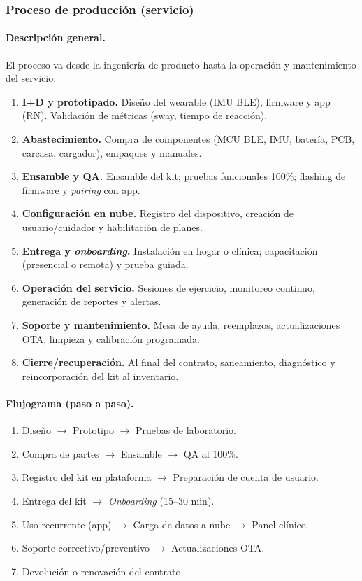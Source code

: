 \subsubsection{Proceso de producción (servicio)}

\paragraph{Descripción general.}
El proceso va desde la ingeniería de producto hasta la operación y mantenimiento del servicio:

\begin{enumerate}
    \item \textbf{I+D y prototipado.} Diseño del wearable (IMU BLE), firmware y app (RN). Validación de métricas (sway, tiempo de reacción).
    \item \textbf{Abastecimiento.} Compra de componentes (MCU BLE, IMU, batería, PCB, carcasa, cargador), empaques y manuales.
    \item \textbf{Ensamble y QA.} Ensamble del kit; pruebas funcionales 100\%; flashing de firmware y \emph{pairing} con app.
    \item \textbf{Configuración en nube.} Registro del dispositivo, creación de usuario/cuidador y habilitación de planes.
    \item \textbf{Entrega y \emph{onboarding}.} Instalación en hogar o clínica; capacitación (presencial o remota) y prueba guiada.
    \item \textbf{Operación del servicio.} Sesiones de ejercicio, monitoreo continuo, generación de reportes y alertas.
    \item \textbf{Soporte y mantenimiento.} Mesa de ayuda, reemplazos, actualizaciones OTA, limpieza y calibración programada.
    \item \textbf{Cierre/recuperación.} Al final del contrato, saneamiento, diagnóstico y reincorporación del kit al inventario.
\end{enumerate}

\paragraph{Flujograma (paso a paso).}
\begin{enumerate}[label=\arabic*.]
\item Diseño $\rightarrow$ Prototipo $\rightarrow$ Pruebas de laboratorio.
\item Compra de partes $\rightarrow$ Ensamble $\rightarrow$ QA al 100\%.
\item Registro del kit en plataforma $\rightarrow$ Preparación de cuenta de usuario.
\item Entrega del kit $\rightarrow$ \emph{Onboarding} (15--30 min).
\item Uso recurrente (app) $\rightarrow$ Carga de datos a nube $\rightarrow$ Panel clínico.
\item Soporte correctivo/preventivo $\rightarrow$ Actualizaciones OTA.
\item Devolución o renovación del contrato.
\end{enumerate}

